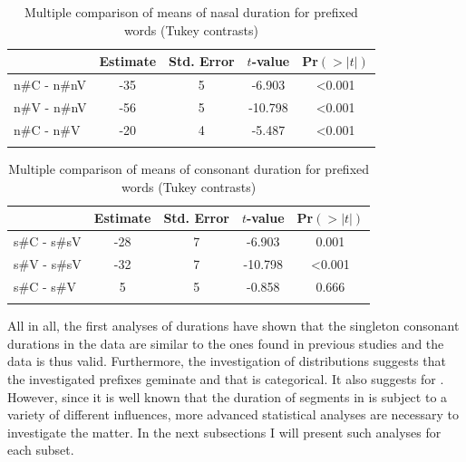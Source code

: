   \begin{table}
  	\caption{Multiple comparison of means of nasal duration for prefixed words (Tukey contrasts)\label{tbl:Tukey un}}
  		\begin{tabular} {lSSSS[table-format=<1.3]}
			\lsptoprule
  			             & {Estimate} & {Std. Error} & {$t$-value}  & {Pr$(>\left|t\right|)$}\\
  			\midrule
  			n\#C - n\#nV & -35 &  5 & -6.903  & <0.001\\
  			n\#V - n\#nV & -56 &  5 & -10.798 & <0.001\\
  			n\#C - n\#V  & -20 &  4 & -5.487  & <0.001 \\
  			\lspbottomrule                                                                                
		\end{tabular}
  	
  \end{table}
  
  
  
  \begin{table}
  	\caption{Multiple comparison of means of consonant duration for prefixed words (Tukey contrasts)\label{tbl:Tukey dis}}
  		\begin{tabular} {lSSSS[table-format=<1.3]}
			\lsptoprule
  			             & {Estimate} & {Std. Error} & {$t$-value}  & {Pr$(>|t|)$}\\
  			\midrule
  			s\#C - s\#sV  &  -28 &  7  & -6.903   & 0.001\\
  			s\#V - s\#sV  & -32  &  7  & -10.798  & <0.001\\
  			s\#C - s\#V   &  5 &  5  &  -0.858  &  0.666\\
            \lspbottomrule                                                                                
		\end{tabular}
  \end{table}
  
  

					

All in all, the first analyses of durations have shown that the singleton consonant durations in the data are similar to the ones found in previous studies and the data is thus valid. Furthermore, the investigation of distributions suggests that the investigated prefixes geminate and that  is categorical. It also suggests  for . 
However, since it is well known that the duration of segments in  is subject to a variety of different influences, more advanced statistical analyses are necessary to investigate the matter. In the next subsections I will present such analyses for each subset.



